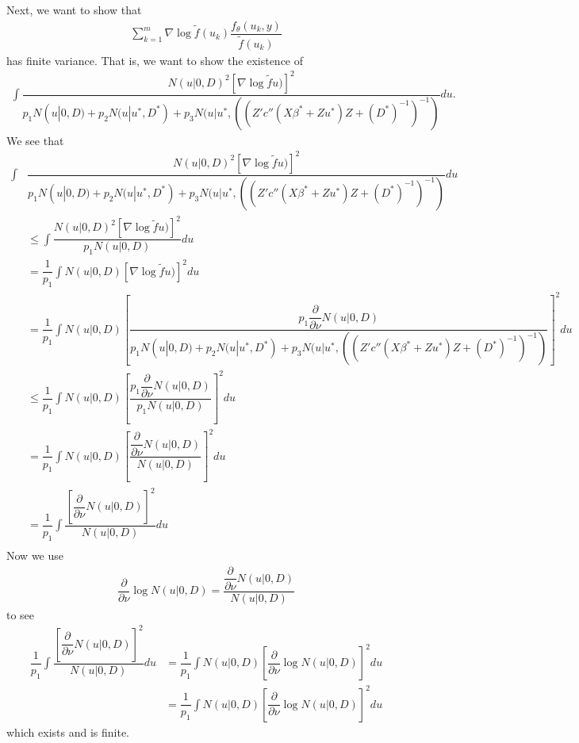 \documentclass{article}
\begin{document}
Next, we want to show that 
\begin{align}
\sum_{k=1}^m \nabla \log \tilde{f} (u_k) \dfrac{f_\theta(u_k,y)}{\tilde{f}(u_k)}
\end{align}
 has finite variance. That is, we want to show the existence of
\begin{align}
\int \dfrac{N(u|0,D)^2 \left[\nabla \log \tilde{f}u) \right]^2}{p_1 N(u|0,D)+p_2 N(u|u^*, D^*) + p_3 N(u|u^*, ((Z'  c''(X \beta^*+Zu^*) Z +(D^*)^{-1}   )^{-1})} du.
\end{align}
We see that
\begin{align}
\int& \dfrac{N(u|0,D)^2 \left[\nabla \log \tilde{f}u) \right]^2}{p_1 N(u|0,D)+p_2 N(u|u^*, D^*) + p_3 N(u|u^*, ((Z'  c''(X \beta^*+Zu^*) Z +(D^*)^{-1}   )^{-1})} du\\
&\leq  \int \dfrac{N(u|0,D)^2 \left[\nabla \log \tilde{f}u) \right]^2}{p_1 N(u|0,D)} du\\
&= \dfrac{1}{p_1} \int N(u|0,D) \left[\nabla \log \tilde{f}u) \right]^2 du\\
&=\dfrac{1}{p_1} \int N(u|0,D) \left[  \dfrac{p_1 \dfrac{\partial}{\partial \nu} N(u|0,D)}{p_1 N(u|0,D)+p_2 N(u|u^*,D^*)+p_3 N(u|u^*, ((Z'  c''(X \beta^*+Zu^*) Z +(D^*)^{-1}   )^{-1})}   \right]^2 du\\
&\leq\dfrac{1}{p_1} \int N(u|0,D) \left[  \dfrac{p_1 \dfrac{\partial}{\partial \nu} N(u|0,D)}{p_1 N(u|0,D)}   \right]^2 du\\
&=\dfrac{1}{p_1} \int N(u|0,D) \left[  \dfrac{ \dfrac{\partial}{\partial \nu} N(u|0,D)}{ N(u|0,D)}   \right]^2 du\\
&= \dfrac{1}{p_1} \int \dfrac{\left[ \dfrac{\partial}{\partial \nu} N(u|0,D)  \right]^2}{N(u|0,D)} du \\
\end{align}
Now we use
\begin{align}
\dfrac{\partial}{\partial \nu} \log N(u|0,D) = \dfrac{\dfrac{\partial}{\partial \nu}  N(u|0,D)}{N(u|0,D)}
\end{align}
to see
\begin{align}
 \dfrac{1}{p_1} \int \dfrac{\left[ \dfrac{\partial}{\partial \nu} N(u|0,D)  \right]^2}{N(u|0,D)} du &=\dfrac{1}{p_1} \int  N(u|0,D) \left[ \dfrac{\partial}{\partial \nu} \log N(u|0,D)  \right]^2 du \\
&= \dfrac{1}{p_1} \int  N(u|0,D) \left[ \dfrac{\partial}{\partial \nu} \log N(u|0,D)  \right]^2 du 
\end{align}
which exists and is finite.
\end{document}
